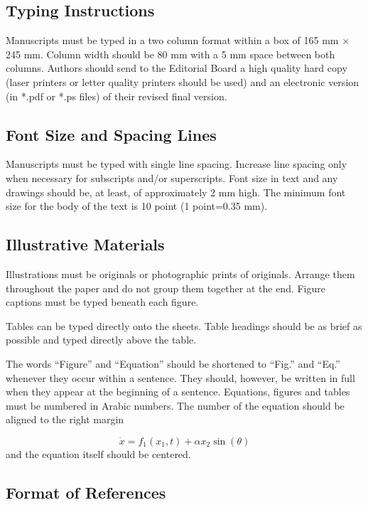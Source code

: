 \subsection{Typing Instructions}

Manuscripts must be typed in a two column format within a box of 165 mm $%
\times $ 245 mm. Column width should be 80 mm with a 5 mm space between both
columns. Authors should send to the Editorial Board a high quality hard copy
(laser printers or letter quality printers should be used) and an electronic
version (in *.pdf or *.ps files) of their revised final version.

\subsection{Font Size and Spacing Lines}

Manuscripts must be typed with single line spacing. Increase line spacing
only when necessary for subscripts and/or superscripts. Font size in text
and any drawings should be, at least, of approximately 2 mm high. The
minimum font size for the body of the text is 10 point (1 point=0.35 mm).

\subsection{Illustrative Materials}

Illustrations must be originals or photographic prints of originals. Arrange
them throughout the paper and do not group them together at the end. Figure
captions must be typed beneath each figure.

Tables can be typed directly onto the sheets. Table headings should be as
brief as possible and typed directly above the table.

The words ``Figure'' and ``Equation'' should be shortened to ``Fig.'' and
``Eq.'' whenever they occur within a sentence. They should, however, be
written in full when they appear at the beginning of a sentence. Equations,
figures and tables must be numbered in Arabic numbers. The number of the
equation should be aligned to the right margin

\begin{equation}
\dot{x}=f_{1}\left( x_{1},t\right) +\alpha x_{2}\sin \left( \theta \right)
\label{eq1}
\end{equation}
and the equation itself should be centered.

\subsection{Format of References}

